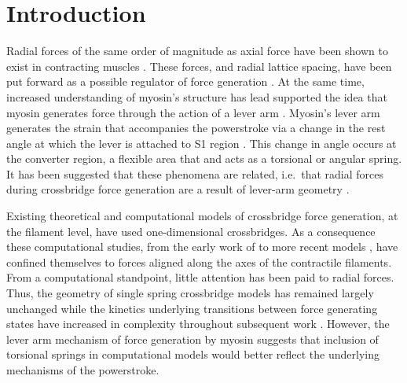 \documentclass[]{article}
\begin{document}
\section{Introduction} %


Radial forces of the same order of magnitude as axial force have been shown to exist in  contracting muscles \citep{Cecchi1990, Millman1998}. 
These forces, and radial lattice spacing, have been put forward as a possible regulator of force generation \citep{Fuchs2005}. 
At the same time, increased understanding of myosin's structure has lead supported the idea that myosin generates force through the action of a lever arm \citep{Rayment1993, Uyeda1996, Huxley2000}.
Myosin's lever arm generates the strain that accompanies the powerstroke via a change in the rest angle at which the lever is attached to S1 region \citep{Huxley2000, Houdusse2001}. 
This change in angle occurs at the converter region, a flexible area that and acts as a torsional or angular spring. 
It has been suggested that these phenomena are related, i.e.\ that radial forces during crossbridge force generation are a result of lever-arm geometry \citep{Schoenberg1980b}. 

Existing theoretical and computational models of crossbridge force generation, at the filament level, have used one-dimensional crossbridges. 
As a consequence these computational studies, from the early work of \citet{Huxley1957} to more recent models \citep{Daniel1998, Chase:2004:p204, Tanner2007}, have confined themselves to forces aligned along the axes of the contractile filaments.  
From a computational standpoint, little attention has been paid to radial forces. 
Thus, the geometry of single spring crossbridge models has remained largely unchanged while the kinetics underlying transitions between force generating states have increased in complexity throughout subsequent work \citep{Pate1989, Daniel1998, Tanner2007}.
However, the lever arm mechanism of force generation by myosin suggests that inclusion of torsional springs in computational models would better reflect the underlying mechanisms of the powerstroke. 
\end{document}

